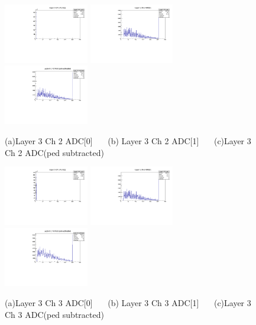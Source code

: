 \documentclass[a4paper,11pt]{article}
\theoremstyle{mytheor}
\begin{document}
\clearpage 
\begin{figure}[H] 
\vspace*{-0.3cm} 
\includegraphics[width=0.33\textwidth,scale=0.5,trim=0 0 0 0,clip]{plotsdir/file0_test-Layer3_Ch2_adc0-1.pdf} 
\includegraphics[width=0.33\textwidth,scale=0.5,trim=0 0 0 0,clip]{plotsdir/file0_test-Layer3_Ch2_adc1-1.pdf} 
\includegraphics[width=0.33\textwidth,scale=0.5,trim=0 0 0 0,clip]{plotsdir/file0_test-Layer3_Ch2_adcPedsub-1.pdf} 
\caption{(a)Layer 3 Ch 2 ADC[0] ~~~(b) Layer 3 Ch 2 ADC[1] ~~~(c)Layer 3 Ch 2 ADC(ped subtracted) } 
\end{figure} 
\begin{figure}[H] 
\vspace*{-0.3cm} 
\includegraphics[width=0.33\textwidth,scale=0.5,trim=0 0 0 0,clip]{plotsdir/file0_test-Layer3_Ch3_adc0-1.pdf} 
\includegraphics[width=0.33\textwidth,scale=0.5,trim=0 0 0 0,clip]{plotsdir/file0_test-Layer3_Ch3_adc1-1.pdf} 
\includegraphics[width=0.33\textwidth,scale=0.5,trim=0 0 0 0,clip]{plotsdir/file0_test-Layer3_Ch3_adcPedsub-1.pdf} 
\caption{(a)Layer 3 Ch 3 ADC[0] ~~~(b) Layer 3 Ch 3 ADC[1] ~~~(c)Layer 3 Ch 3 ADC(ped subtracted) } 
\end{figure} 
\end{document}
